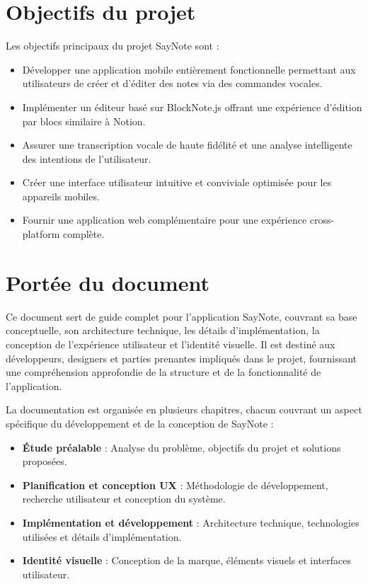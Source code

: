 \vspace{1cm}

\section*{Objectifs du projet}

Les objectifs principaux du projet SayNote sont :

\begin{itemize}
    \item Développer une application mobile entièrement fonctionnelle permettant aux utilisateurs de créer et d'éditer des notes via des commandes vocales.
    \item Implémenter un éditeur basé sur BlockNote.js offrant une expérience d'édition par blocs similaire à Notion.
    \item Assurer une transcription vocale de haute fidélité et une analyse intelligente des intentions de l'utilisateur.
    \item Créer une interface utilisateur intuitive et conviviale optimisée pour les appareils mobiles.
    \item Fournir une application web complémentaire pour une expérience cross-platform complète.
\end{itemize}

\vspace{1cm}

\section*{Portée du document}

Ce document sert de guide complet pour l'application SayNote, couvrant sa base conceptuelle, son architecture technique, les détails d'implémentation, la conception de l'expérience utilisateur et l'identité visuelle. Il est destiné aux développeurs, designers et parties prenantes impliqués dans le projet, fournissant une compréhension approfondie de la structure et de la fonctionnalité de l'application.

La documentation est organisée en plusieurs chapitres, chacun couvrant un aspect spécifique du développement et de la conception de SayNote :

\begin{itemize}
    \item \textbf{Étude préalable} : Analyse du problème, objectifs du projet et solutions proposées.
    \item \textbf{Planification et conception UX} : Méthodologie de développement, recherche utilisateur et conception du système.
    \item \textbf{Implémentation et développement} : Architecture technique, technologies utilisées et détails d'implémentation.
    \item \textbf{Identité visuelle} : Conception de la marque, éléments visuels et interfaces utilisateur.
\end{itemize}

